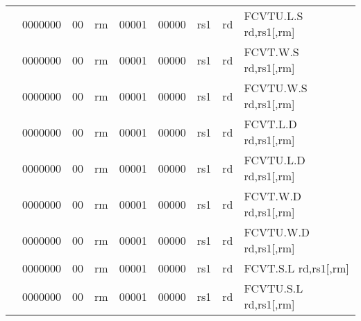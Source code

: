 \begin{table}[p]
\begin{small}
\begin{center}
\begin{tabular}{rcccccccccl}
&
\multicolumn{1}{|c|}{0000000} &
\multicolumn{1}{c|}{00} &
\multicolumn{2}{c|}{rm} &
\multicolumn{2}{c|}{00001} &
\multicolumn{1}{c|}{00000} &
\multicolumn{1}{c|}{rs1} &
\multicolumn{1}{c|}{rd} & FCVTU.L.S rd,rs1[,rm] \\
\cline{2-10}
  

&
\multicolumn{1}{|c|}{0000000} &
\multicolumn{1}{c|}{00} &
\multicolumn{2}{c|}{rm} &
\multicolumn{2}{c|}{00001} &
\multicolumn{1}{c|}{00000} &
\multicolumn{1}{c|}{rs1} &
\multicolumn{1}{c|}{rd} & FCVT.W.S rd,rs1[,rm] \\
\cline{2-10}
  

&
\multicolumn{1}{|c|}{0000000} &
\multicolumn{1}{c|}{00} &
\multicolumn{2}{c|}{rm} &
\multicolumn{2}{c|}{00001} &
\multicolumn{1}{c|}{00000} &
\multicolumn{1}{c|}{rs1} &
\multicolumn{1}{c|}{rd} & FCVTU.W.S rd,rs1[,rm] \\
\cline{2-10}
  

&
\multicolumn{1}{|c|}{0000000} &
\multicolumn{1}{c|}{00} &
\multicolumn{2}{c|}{rm} &
\multicolumn{2}{c|}{00001} &
\multicolumn{1}{c|}{00000} &
\multicolumn{1}{c|}{rs1} &
\multicolumn{1}{c|}{rd} & FCVT.L.D rd,rs1[,rm] \\
\cline{2-10}
  

&
\multicolumn{1}{|c|}{0000000} &
\multicolumn{1}{c|}{00} &
\multicolumn{2}{c|}{rm} &
\multicolumn{2}{c|}{00001} &
\multicolumn{1}{c|}{00000} &
\multicolumn{1}{c|}{rs1} &
\multicolumn{1}{c|}{rd} & FCVTU.L.D rd,rs1[,rm] \\
\cline{2-10}
  

&
\multicolumn{1}{|c|}{0000000} &
\multicolumn{1}{c|}{00} &
\multicolumn{2}{c|}{rm} &
\multicolumn{2}{c|}{00001} &
\multicolumn{1}{c|}{00000} &
\multicolumn{1}{c|}{rs1} &
\multicolumn{1}{c|}{rd} & FCVT.W.D rd,rs1[,rm] \\
\cline{2-10}
  

&
\multicolumn{1}{|c|}{0000000} &
\multicolumn{1}{c|}{00} &
\multicolumn{2}{c|}{rm} &
\multicolumn{2}{c|}{00001} &
\multicolumn{1}{c|}{00000} &
\multicolumn{1}{c|}{rs1} &
\multicolumn{1}{c|}{rd} & FCVTU.W.D rd,rs1[,rm] \\
\cline{2-10}
  

&
\multicolumn{1}{|c|}{0000000} &
\multicolumn{1}{c|}{00} &
\multicolumn{2}{c|}{rm} &
\multicolumn{2}{c|}{00001} &
\multicolumn{1}{c|}{00000} &
\multicolumn{1}{c|}{rs1} &
\multicolumn{1}{c|}{rd} & FCVT.S.L rd,rs1[,rm] \\
\cline{2-10}
  

&
\multicolumn{1}{|c|}{0000000} &
\multicolumn{1}{c|}{00} &
\multicolumn{2}{c|}{rm} &
\multicolumn{2}{c|}{00001} &
\multicolumn{1}{c|}{00000} &
\multicolumn{1}{c|}{rs1} &
\multicolumn{1}{c|}{rd} & FCVTU.S.L rd,rs1[,rm] \\
\cline{2-10}
  


\end{tabular}
\end{center}
\end{small}
\end{table}
